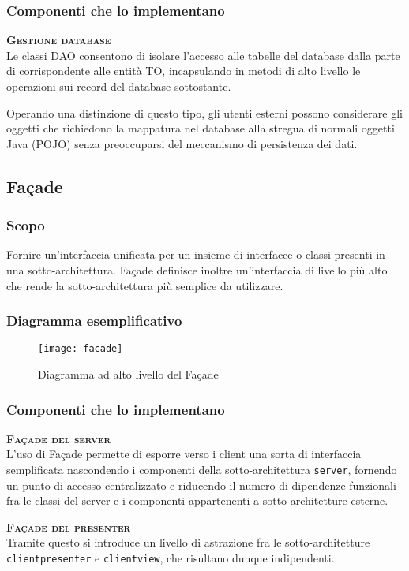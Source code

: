 \subsubsection{Componenti che lo implementano}
\begin{description}
\item{\scshape\bfseries Gestione database}\\
Le classi DAO consentono di isolare l'accesso alle tabelle del database dalla parte di  corrispondente alle entità TO, incapsulando in metodi di alto livello le operazioni sui record del database sottostante.

Operando una distinzione di questo tipo, gli utenti esterni possono considerare gli oggetti che richiedono la mappatura nel database alla stregua di normali oggetti Java (POJO) senza preoccuparsi del meccanismo di persistenza dei dati.
\end{description}

\subsection{Façade}

\subsubsection{Scopo}
Fornire un'interfaccia unificata per un insieme di interfacce o classi presenti in una sotto-architettura. Façade definisce inoltre un'interfaccia di livello più alto che rende la sotto-architettura più semplice da utilizzare.

\subsubsection{Diagramma esemplificativo}
\begin{figure}[H]
\centering
\texttt{[image: facade]}
\caption{Diagramma ad alto livello del  Façade}\label{fig:façade}
\end{figure}

\subsubsection{Componenti che lo implementano}
\begin{description}
  \item{\scshape\bfseries Façade del server}\\
L'uso di Façade permette di esporre verso i client una sorta di interfaccia semplificata nascondendo i componenti della sotto-architettura \texttt{server}, fornendo un punto di accesso centralizzato e riducendo il numero di dipendenze funzionali fra le classi del server e i componenti appartenenti a sotto-architetture esterne.
  \item{\scshape\bfseries Façade del presenter}\\
Tramite questo  si introduce un livello di astrazione fra le sotto-architetture \texttt{clientpresenter} e \texttt{clientview}, che risultano dunque indipendenti.
\end{description}

